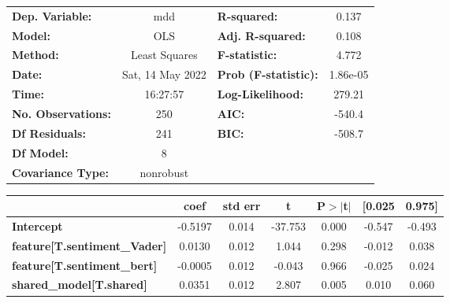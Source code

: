 \begin{center}
\begin{tabular}{lclc}
\toprule
\textbf{Dep. Variable:}                       &       mdd        & \textbf{  R-squared:         } &     0.137   \\
\textbf{Model:}                               &       OLS        & \textbf{  Adj. R-squared:    } &     0.108   \\
\textbf{Method:}                              &  Least Squares   & \textbf{  F-statistic:       } &     4.772   \\
\textbf{Date:}                                & Sat, 14 May 2022 & \textbf{  Prob (F-statistic):} &  1.86e-05   \\
\textbf{Time:}                                &     16:27:57     & \textbf{  Log-Likelihood:    } &    279.21   \\
\textbf{No. Observations:}                    &         250      & \textbf{  AIC:               } &    -540.4   \\
\textbf{Df Residuals:}                        &         241      & \textbf{  BIC:               } &    -508.7   \\
\textbf{Df Model:}                            &           8      & \textbf{                     } &             \\
\textbf{Covariance Type:}                     &    nonrobust     & \textbf{                     } &             \\
\bottomrule
\end{tabular}
\begin{tabular}{lcccccc}
                                              & \textbf{coef} & \textbf{std err} & \textbf{t} & \textbf{P$> |$t$|$} & \textbf{[0.025} & \textbf{0.975]}  \\
\midrule
\textbf{Intercept}                            &      -0.5197  &        0.014     &   -37.753  &         0.000        &       -0.547    &       -0.493     \\
\textbf{feature[T.sentiment\_Vader]}          &       0.0130  &        0.012     &     1.044  &         0.298        &       -0.012    &        0.038     \\
\textbf{feature[T.sentiment\_bert]}           &      -0.0005  &        0.012     &    -0.043  &         0.966        &       -0.025    &        0.024     \\
\textbf{shared\_model[T.shared]}              &       0.0351  &        0.012     &     2.807  &         0.005        &        0.010    &        0.060     \\

\end{tabular}
\end{center}
